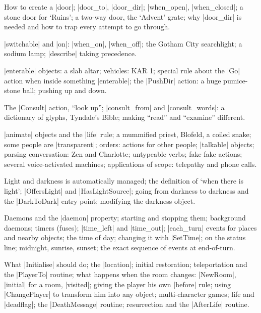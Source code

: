 %
How to create a |door|; |door_to|, |door_dir|; |when_open|, |when_closed|;
a stone door for `Ruins'; a two-way door, the `Advent' grate; why
|door_dir| is needed and how to trap every attempt to go through.

%
|switchable| and |on|: |when_on|, |when_off|; the Gotham City searchlight;
a sodium lamp; |describe| taking precedence.

%
|enterable| objects: a slab altar; vehicles: KAR 1; special rule about
the |Go| action when inside something |enterable|; the |PushDir| action:
a huge pumice-stone ball; pushing up and down.

%
The |Consult| action, ``look up''; |consult_from| and |consult_words|:
a dictionary of glyphs, Tyndale's Bible; making ``read'' and ``examine''
different.

%
|animate| objects and the |life| rule; a mummified priest, Blofeld,
a coiled snake; some people are |transparent|; orders: actions for other
people; |talkable| objects; parsing conversation: Zen and Charlotte;
untypeable verbs; fake fake actions; several voice-activated machines;
applications of scope: telepathy and phone calls.

%
Light and darkness is automatically managed; the definition of `when there
is light'; |OffersLight| and |HasLightSource|; going from darkness to
darkness and the |DarkToDark| entry point; modifying the darkness object.

%
Daemons and the |daemon| property; starting and stopping them; background
daemons; timers (fuses); |time_left| and |time_out|; |each_turn| events for
places and nearby objects; the time of day; changing it with |SetTime|; on
the status line; midnight, sunrise, sunset; the exact sequence of events
at end-of-turn.

%
What |Initialise| should do; the |location|; initial restoration;
teleportation and the |PlayerTo| routine; what happens when the room
changes: |NewRoom|, |initial| for a room, |visited|; giving the player his
own |before| rule; using |ChangePlayer| to transform him into any object;
multi-character games; life and |deadflag|; the |DeathMessage| routine;
resurrection and the |AfterLife| routine.

